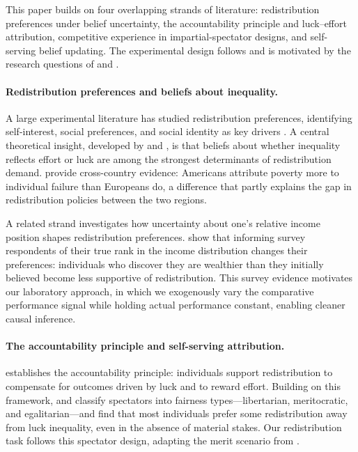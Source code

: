 \documentclass[12pt]{article}
\begin{document}
This paper builds on four overlapping strands of literature: redistribution
preferences under belief uncertainty, the accountability principle and
luck--effort attribution, competitive experience in impartial-spectator
designs, and self-serving belief updating.
The experimental design follows \citet{Almas2020} and is motivated by the
research questions of \citet{Cassar2019} and \citet{Deffains2016}.

\paragraph{Redistribution preferences and beliefs about inequality.}
A large experimental literature has studied redistribution preferences,
identifying self-interest, social preferences, and social identity as key
drivers \citep{AlesinGiulian2011}.
A central theoretical insight, developed by \citet{Piketty1995} and
\citet{Benabou2006}, is that beliefs about whether inequality reflects effort
or luck are among the strongest determinants of redistribution demand.
\citet{Alesina2005} provide cross-country evidence: Americans attribute
poverty more to individual failure than Europeans do, a difference that
partly explains the gap in redistribution policies between the two regions.

A related strand investigates how uncertainty about one's relative income
position shapes redistribution preferences.
\citet{Karadja2017} show that informing survey respondents of their true
rank in the income distribution changes their preferences: individuals who
discover they are wealthier than they initially believed become less
supportive of redistribution.
This survey evidence motivates our laboratory approach, in which we
exogenously vary the comparative performance signal while holding actual
performance constant, enabling cleaner causal inference.

\paragraph{The accountability principle and self-serving attribution.}
\citet{Konow2000} establishes the accountability principle: individuals
support redistribution to compensate for outcomes driven by luck and to
reward effort.
Building on this framework, \citet{Cappelen2007} and \citet{Cappelen2013}
classify spectators into fairness types---libertarian, meritocratic, and
egalitarian---and find that most individuals prefer some redistribution away
from luck inequality, even in the absence of material stakes.
Our redistribution task follows this spectator design, adapting the merit
scenario from \citet{Almas2020}.
\end{document}
